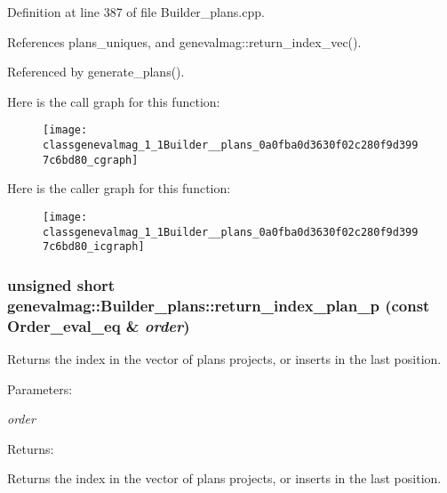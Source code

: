 Definition at line 387 of file Builder\_\-plans.cpp.

References plans\_\-uniques, and genevalmag::return\_\-index\_\-vec().

Referenced by generate\_\-plans().

Here is the call graph for this function:\nopagebreak
\begin{figure}[H]
\begin{center}
\leavevmode
\texttt{[image: classgenevalmag\_1\_1Builder\_\_plans\_0a0fba0d3630f02c280f9d3997c6bd80\_cgraph]}
\end{center}
\end{figure}


Here is the caller graph for this function:\nopagebreak
\begin{figure}[H]
\begin{center}
\leavevmode
\texttt{[image: classgenevalmag\_1\_1Builder\_\_plans\_0a0fba0d3630f02c280f9d3997c6bd80\_icgraph]}
\end{center}
\end{figure}
\hypertarget{classgenevalmag_1_1Builder__plans_08c73ceb7e4bbd71732cac943ccfbaa9}{
\subsubsection[{return\_\-index\_\-plan\_\-p}]{\setlength{\rightskip}{0pt plus 5cm}unsigned short genevalmag::Builder\_\-plans::return\_\-index\_\-plan\_\-p (const {\bf Order\_\-eval\_\-eq} \& {\em order})}}
\label{classgenevalmag_1_1Builder__plans_08c73ceb7e4bbd71732cac943ccfbaa9}


Returns the index in the vector of plans projects, or inserts in the last position. \begin{Desc}
\item[Parameters:]
\begin{description}
\item[{\em order}]\end{description}
\end{Desc}
\begin{Desc}
\item[Returns:]\end{Desc}
Returns the index in the vector of plans projects, or inserts in the last position. 


